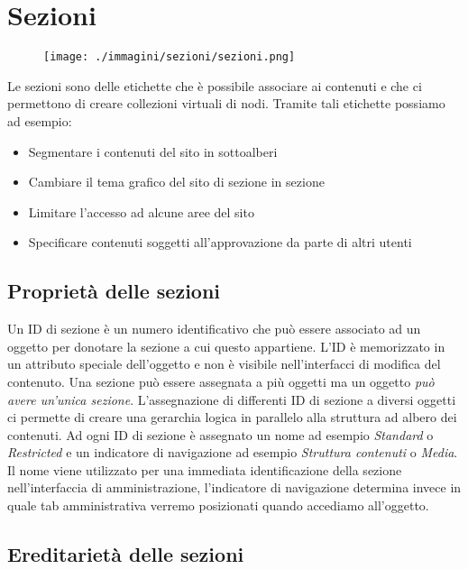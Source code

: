 \chapter{Sezioni}

\begin{figure}[H]
 \centering
 \texttt{[image: ./immagini/sezioni/sezioni.png]}
 \label{fig:sez_schema}
\end{figure}


Le sezioni sono delle etichette che è possibile associare ai contenuti e che ci permettono di creare collezioni virtuali di nodi. Tramite tali etichette possiamo ad esempio:
\begin{itemize}
 \item Segmentare i contenuti del sito in sottoalberi
 \item Cambiare il tema grafico del sito di sezione in sezione
 \item Limitare l'accesso ad alcune aree del sito
 \item Specificare contenuti soggetti all'approvazione da parte di altri utenti
\end{itemize}
\section{Proprietà delle sezioni}
Un ID di sezione  è un numero identificativo che può essere associato ad un oggetto per donotare la sezione a cui questo appartiene. L'ID è memorizzato in un attributo speciale dell'oggetto e non è visibile nell'interfacci di modifica del contenuto. Una sezione può essere assegnata a più oggetti ma un oggetto \emph{può avere un'unica sezione}.
L'assegnazione di differenti ID di sezione a diversi oggetti ci permette di creare una gerarchia logica in parallelo alla struttura ad albero dei contenuti.
Ad ogni ID di sezione è assegnato un nome ad esempio \textsl{Standard} o \textsl{Restricted} e un indicatore di navigazione ad esempio \textsl{Struttura contenuti} o \textsl{Media}. Il nome viene utilizzato per una immediata identificazione della sezione nell'interfaccia di amministrazione, l'indicatore di navigazione  determina invece in quale tab amministrativa verremo posizionati quando accediamo all'oggetto.

\section{Ereditarietà delle sezioni}
  
